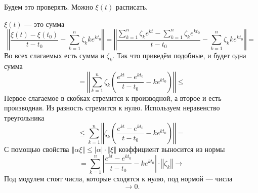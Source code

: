 Будем это проверять.
Можно $ \xi \left( t \right) $ расписать.

$ \xi \left( t \right) $ --- это сумма
$$ \left \Vert
    \frac{ \xi \left( t \right) - \xi \left( t_0 \right) }{t - t_0} -
    \sum \limits_{k = 1}^n \zeta_k k e^{kt_0} \right \Vert =
  \left \Vert
    \frac{ \sum \limits_{k = 1}^n \zeta_k e^{kt} - \sum \limits_{k = 1}^n \zeta_k e^{kt_0}}{t - t_0} -
    \sum \limits_{k = 1}^n \zeta_k ke^{kt_0} \right \Vert =$$
Во всех слагаемых есть сумма и $ \zeta_k$.
Так что приведём подобные, и будет одна сумма
$$= \left \Vert
    \sum \limits_{k = 1}^n \zeta_k \left( \frac{e^{kt} - e^{kt_0}}{t - t_0} - ke^{kt_0} \right)
  \right \Vert \leq$$
Первое слагаемое в скобках стремится к производной, а второе и есть производная.
Из разность стремится к нулю.
Используем неравенство треугольника
$$ \leq \sum \limits_{k = 1}^n
  \left \Vert \zeta_k \left( \frac{e^{kt} - e^{kt_0}}{t - t_0} - ke^{kt_0} \right) \right \Vert =$$
С помощью свойства
$ \left \Vert \alpha \xi \right \Vert \leq
  \left| \alpha \right| \cdot \left \Vert \xi \right \Vert $
коэффициент выносится из нормы
$$= \sum \limits_{k = 1}^n
    \left| \frac{e^{kt} - e^{kt_0}}{t - t_0} - ke^{kt_0} \right| \cdot
    \left \Vert \zeta_k \right \Vert \to$$
Под модулем стоят числа, которые сходятся к нулю, под нормой --- числа
$$ \to 0.$$
